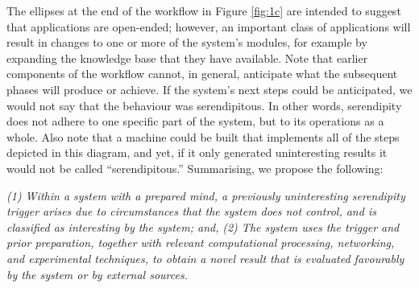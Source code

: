 The ellipses at the end of the workflow in Figure \ref{fig:1c} are
intended to suggest that applications are open-ended; however, an
important class of applications will result in changes to one or more
of the system's modules, for example by expanding the knowledge base
that they have available.  Note that earlier components of the workflow
cannot, in general, anticipate what the subsequent phases will produce
or achieve.  If the system's next steps could be anticipated, we would
not say that the behaviour was serendipitous.  In other words,
serendipity does not adhere to one specific part of the system, but to
its operations as a whole.  Also note that a machine could be built
that implements all of the steps depicted in this diagram, and yet, if
it only generated uninteresting results it would not be called
``serendipitous.''  Summarising, we propose the following:
\begin{ndef}
\emph{(1) Within a system with a prepared mind, a previously uninteresting serendipity trigger arises due to circumstances that the system does not control, and is classified as interesting by the system; and,}
\emph{(2) The system uses the trigger and prior preparation, together with relevant computational processing, networking, and experimental techniques, to obtain a novel result that is evaluated favourably by the system or by external sources.}
\end{ndef}



